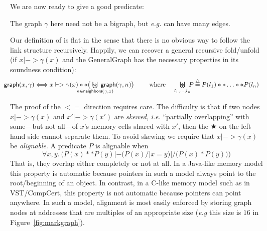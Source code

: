 We are now ready to give a good  predicate:
\fi

The graph $\gamma$ here need not be a bigraph, but \emph{e.g.} can have many edges.

Our definition of  is flat in the sense that there is no obvious way to follow the link structure recursively.  Happily, we can recover a general recursive fold/unfold (if $x |-> \gamma(x)$ and the GeneralGraph has the necessary properties in its soundness condition):
\vspace{-1ex}
\begin{equation}
\label{eqn:unfold_graph}
\hspace{-1em}\begin{array}{@{}lc@{\hspace{1pt}}c@{\hspace{1pt}}l@{}}
\p{graph}(x,\gamma)  <=>  x |-> \gamma(x) ** \big(\!\!\!\!\!\!\!\!\!\!\!\!\!\underset{n \in \p{neighbors}(\gamma,x)}{\bigocon}\!\!\!\!\!\!\!\!\!\!\!\! \p{graph}(\gamma,n) \big)
\quad \text{~~~ where ~~ }\underset{l_1,\dots,l_n}{\raisebox{-0.3ex}{\resizebox{0.75em}{!}{\hspace{0.05em}$\scon$}}\hspace{-2.18ex} \bigcup} \! \! P  \defeq  P(l_1) ** \ldots ** P(l_n) \end{array}
\vspace{-1ex}
\end{equation}

The proof of the $<=$ direction requires care. The difficulty is that if two nodes $x |-> \gamma(x)$ and $x' |-> \gamma(x')$ are \emph{skewed}, \emph{i.e.} ``partially overlapping'' with some---but not all---of $x$'s memory cells shared with $x'$, then the $\bigstar$ on the left hand side cannot separate them.  To avoid skewing we require that $x |-> \gamma(x)$ be \emph{alignable}. A predicate $P$ is alignable when
\[
\forall x,y.~ \Big(P(x) ** P(y) |- \big(P(x) /| x = y\big) |/ \big(P(x) * P(y)\big)\Big)
\]
That is, they overlap either completely or not at all. In a Java-like memory model this property is automatic because pointers in such a model always point to the root/beginning of an object.  In contrast, in a C-like memory model such as in VST/CompCert, this property is not automatic because pointers can point anywhere.  In such a model, alignment is most easily enforced by storing graph nodes at addresses that are multiples of an appropriate size (\emph{e.g} this size is $16$ in Figure~\ref{fig:markgraph}).

